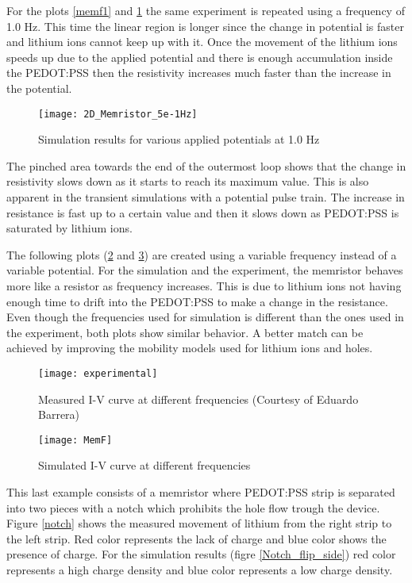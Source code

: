 \begin{doublespace}
For the plots \ref{memf1} and \ref{2D_Memristor_5e-1Hz} the same experiment is repeated using a frequency of 1.0 Hz. This time the linear region is longer since the change in potential is faster and lithium ions cannot keep up with it. Once the movement of the lithium ions speeds up due to the applied potential and there is enough accumulation inside the PEDOT:PSS then the resistivity increases much faster than the increase in the potential. 

\begin{figure}[!htp]
\centering
\texttt{[image: 2D\_Memristor\_5e-1Hz]}
\caption{Simulation results for various applied potentials at 1.0 Hz} 
\label{2D_Memristor_5e-1Hz}
\end{figure}

The pinched area towards the end of the outermost loop shows that the change in resistivity slows down as it starts to reach its maximum value. This is also apparent in the transient simulations with a potential pulse train. The increase in resistance is fast up to a certain value and then it slows down as PEDOT:PSS is saturated by lithium ions.

The following plots (\ref{experimental} and \ref{MemF}) are created using a variable frequency instead of a variable potential. For the simulation and the experiment, the memristor behaves more like a resistor as frequency increases. This is due to lithium ions not having enough time to drift into the PEDOT:PSS to make a change in the resistance. Even though the frequencies used for simulation is different than the ones used in the experiment, both plots show similar behavior. A better match can be achieved by improving the mobility models used for lithium ions and holes. 

\begin{figure}[!htp]
\centering
\texttt{[image: experimental]}
\caption{Measured I-V curve at different frequencies (Courtesy of Eduardo Barrera)} 
\label{experimental}
\end{figure}

\begin{figure}[!htp]
\centering
\texttt{[image: MemF]}
\caption{Simulated I-V curve at different frequencies } 
\label{MemF}
\end{figure}

\clearpage
This last example consists of a memristor where PEDOT:PSS strip is separated into two pieces with a notch which prohibits the hole flow trough the device. Figure \ref{notch} shows the measured movement of lithium from the right strip to the left strip. Red color represents the lack of charge and blue color shows the presence of charge. For the simulation results (figre \ref{Notch_flip_side}) red color represents a high charge density and blue color represents a low charge density.


\end{doublespace}
